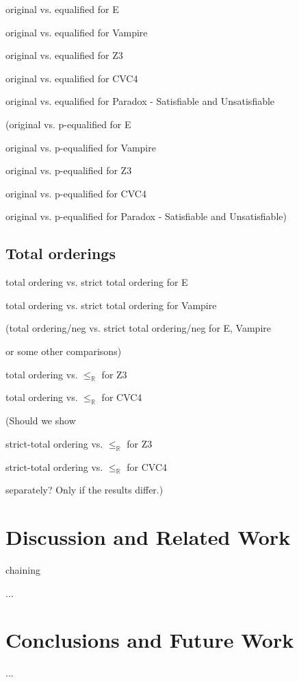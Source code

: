 \documentclass{easychair}
\begin{document}
original vs. equalified for E

original vs. equalified for Vampire

original vs. equalified for Z3

original vs. equalified for CVC4

original vs. equalified for Paradox - Satisfiable and Unsatisfiable

(original vs. p-equalified for E

original vs. p-equalified for Vampire

original vs. p-equalified for Z3

original vs. p-equalified for CVC4

original vs. p-equalified for Paradox - Satisfiable and Unsatisfiable)

\subsection{Total orderings}

total ordering vs. strict total ordering for E

total ordering vs. strict total ordering for Vampire

(total ordering/neg vs. strict total ordering/neg for E, Vampire

or some other comparisons)

total ordering vs. $\leq_\mathbb{R}$ for Z3

total ordering vs. $\leq_\mathbb{R}$ for CVC4

(Should we show

strict-total ordering vs. $\leq_\mathbb{R}$ for Z3

strict-total ordering vs. $\leq_\mathbb{R}$ for CVC4

separately? Only if the results differ.)


\section{Discussion and Related Work}

chaining \cite{bachmair1998ordered}

...


\section{Conclusions and Future Work}

...




\end{document}
